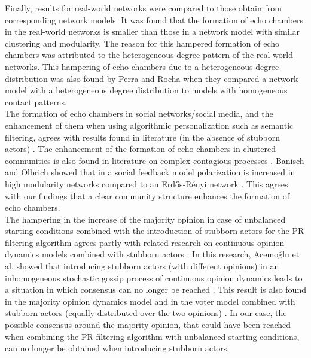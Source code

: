 \documentclass[11 pt , letterpaper , twoside , openright]{book}
\begin{document}
\newline
Finally, results for real-world networks were compared to those obtain from corresponding network models. It was found that the formation of echo chambers in the real-world networks is smaller than those in a network model with similar clustering and modularity. The reason for this hampered formation of echo chambers was attributed to the heterogeneous degree pattern of the real-world networks. This hampering of echo chambers due to a heterogeneous degree distribution was also found by Perra and Rocha \cite{Perra2019} when they compared a network model with a heterogeneous degree distribution to models with homogeneous contact patterns.\\
\newline
The formation of echo chambers in social networks/social media, and the enhancement of them when using algorithmic personalization such as semantic filtering, agrees with results found in literature (in the absence of stubborn actors) \cite{Baumann2019}\cite{Cinelli2020}\cite{Nikolov2015}\cite{Sirbu2018}. The enhancement of the formation of echo chambers in clustered communities is also found in literature on complex contagious processes \cite{Becker2017}. Banisch and Olbrich showed that in a social feedback model polarization is increased in high modularity networks compared to an Erd\H{o}s-R\'{e}nyi network \cite{Banisch2018}. This agrees with our findings that a clear community structure enhances the formation of echo chambers.\\
\newline
The hampering in the increase of the majority opinion in case of unbalanced starting conditions combined with the introduction of stubborn actors for the PR filtering algorithm agrees partly with related research on continuous opinion dynamics models combined with stubborn actors \cite{Como2013}. In this research, Acemo\u{g}lu et al. showed that introducing stubborn actors (with different opinions) in an inhomogeneous stochastic gossip process of continuous opinion dynamics leads to a situation in which consensus can no longer be reached \cite{Como2013}. This result is also found in the majority opinion dynamics model and in the voter model combined with stubborn actors (equally distributed over the two opinions) \cite{Galam2007}\cite{Mobilia2007}\cite{Yildiz2013}. In our case, the possible consensus around the majority opinion, that could have been reached when combining the PR filtering algorithm with unbalanced starting conditions, can no longer be obtained when introducing stubborn actors.\\
\end{document}
